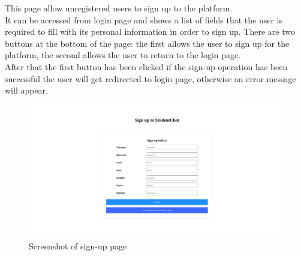This page allow unregistered users to sign up to the platform.\\
It can be accessed from login page and shows a list of fields that the user is required to fill with its personal information in order to sign up.
There are two buttons at the bottom of the page: the first allows the user to sign up for the platform, the second allows the user to return to the login page. \\
After that the first button has been clicked if the sign-up operation has been successful the user will get redirected to login page, otherwise an error message will appear.

\begin{figure}[H]
    \centering
    \includegraphics[width=\textwidth]{img/user_manual/student/signup.png}
    \caption{Screenshot of sign-up page}
\end{figure}